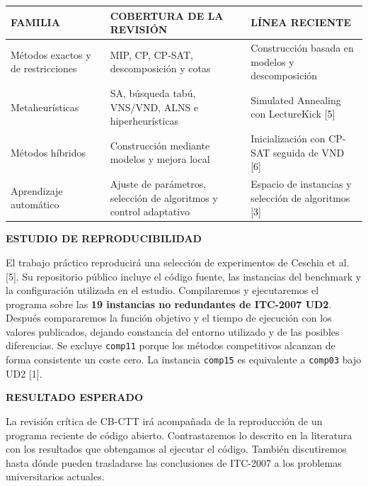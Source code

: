 \documentclass[10pt]{article}
\newcommand{\proposalheading}[1]{%
  \vspace{1.8mm}%
  {\color{wine}\sffamily\fontsize{9.8}{11.2}\selectfont\bfseries
  \MakeUppercase{#1}}\par
  \vspace{0.55mm}%
}
\begin{document}
\begin{minipage}[t][0.98\textheight][t]{\textwidth}
\vspace{0.7mm}
\noindent\begin{tabularx}{\linewidth}{@{}F A E@{}}
\toprule[0.65pt]
\color{wine}\sffamily\bfseries FAMILIA &
\color{wine}\sffamily\bfseries COBERTURA DE LA REVISIÓN &
\color{wine}\sffamily\bfseries LÍNEA RECIENTE\\
\midrule[0.45pt]
Métodos exactos y de restricciones & MIP, CP, CP-SAT, descomposición y cotas & Construcción basada en modelos y descomposición\\
\midrule[0.35pt]
Metaheurísticas & SA, búsqueda tabú, VNS/VND, ALNS e hiperheurísticas & Simulated Annealing con LectureKick [5]\\
\midrule[0.35pt]
Métodos híbridos & Construcción mediante modelos y mejora local & Inicialización con CP-SAT seguida de VND [6]\\
\midrule[0.35pt]
Aprendizaje automático & Ajuste de parámetros, selección de algoritmos y control adaptativo & Espacio de instancias y selección de algoritmos [3]\\
\bottomrule[0.65pt]
\end{tabularx}

\proposalheading{Estudio de reproducibilidad}
{\fontsize{9.2}{11}\selectfont\justifying
El trabajo práctico reproducirá una selección de experimentos de Ceschia et al. [5]. Su repositorio público incluye el código fuente, las instancias del benchmark y la configuración utilizada en el estudio. Compilaremos y ejecutaremos el programa sobre las \textbf{19 instancias no redundantes de ITC-2007 UD2}. Después compararemos la función objetivo y el tiempo de ejecución con los valores publicados, dejando constancia del entorno utilizado y de las posibles diferencias. Se excluye \texttt{comp11} porque los métodos competitivos alcanzan de forma consistente un coste cero. La instancia \texttt{comp15} es equivalente a \texttt{comp03} bajo UD2 [1].\par}

\proposalheading{Resultado esperado}
{\fontsize{9.2}{11}\selectfont\justifying
La revisión crítica de CB-CTT irá acompañada de la reproducción de un programa reciente de código abierto. Contrastaremos lo descrito en la literatura con los resultados que obtengamos al ejecutar el código. También discutiremos hasta dónde pueden trasladarse las conclusiones de ITC-2007 a los problemas universitarios actuales.\par}


\end{minipage}
\end{document}
